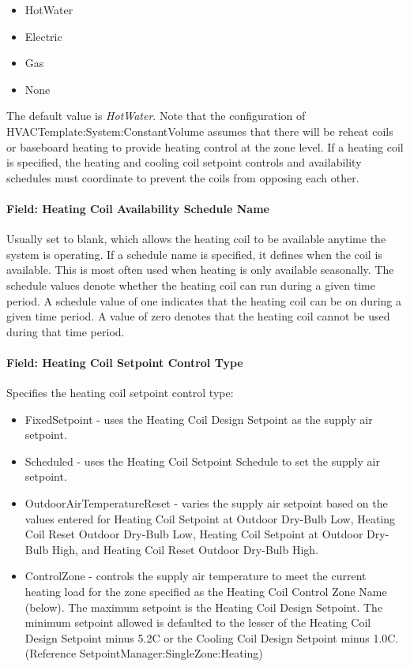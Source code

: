 \begin{itemize}
\item
  HotWater
\item
  Electric
\item
  Gas
\item
  None
\end{itemize}

The default value is \emph{HotWater}. Note that the configuration of HVACTemplate:System:ConstantVolume assumes that there will be reheat coils or baseboard heating to provide heating control at the zone level. If a heating coil is specified, the heating and cooling coil setpoint controls and availability schedules must coordinate to prevent the coils from opposing each other.

\paragraph{Field: Heating Coil Availability Schedule Name}\label{field-heating-coil-availability-schedule-name-6}

Usually set to blank, which allows the heating coil to be available anytime the system is operating. If a schedule name is specified, it defines when the coil is available. This is most often used when heating is only available seasonally. The schedule values denote whether the heating coil can run during a given time period. A schedule value of one indicates that the heating coil can be on during a given time period. A value of zero denotes that the heating coil cannot be used during that time period.

\paragraph{Field: Heating Coil Setpoint Control Type}\label{field-heating-coil-setpoint-control-type}

Specifies the heating coil setpoint control type:

\begin{itemize}
\item
  FixedSetpoint - uses the Heating Coil Design Setpoint as the supply air setpoint.
\item
  Scheduled - uses the Heating Coil Setpoint Schedule to set the supply air setpoint.
\item
  OutdoorAirTemperatureReset - varies the supply air setpoint based on the values entered for Heating Coil Setpoint at Outdoor Dry-Bulb Low, Heating Coil Reset Outdoor Dry-Bulb Low, Heating Coil Setpoint at Outdoor Dry-Bulb High, and Heating Coil Reset Outdoor Dry-Bulb High.
\item
  ControlZone - controls the supply air temperature to meet the current heating load for the zone specified as the Heating Coil Control Zone Name (below). The maximum setpoint is the Heating Coil Design Setpoint. The minimum setpoint allowed is defaulted to the lesser of the Heating Coil Design Setpoint minus 5.2C or the Cooling Coil Design Setpoint minus 1.0C. (Reference SetpointManager:SingleZone:Heating)
\end{itemize}


